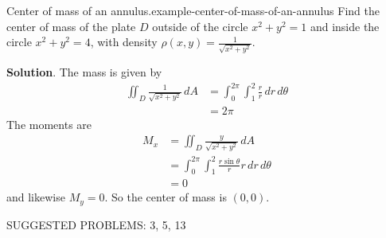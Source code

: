 \documentclass[10pt,]{book}
\numberwithin{equation}{section}
\begin{document}
\begin{example}{Center of mass of an annulus.}{example-center-of-mass-of-an-annulus}%
\hypertarget{p-1500}{}%
Find the center of mass of the plate \(D\) outside of the circle \(x^{2}+y^{2} = 1\) and inside the circle \(x^{2} + y^{2} = 4\), with density \(\rho(x,y) = \frac{1}{\sqrt{x^{2} + y^{2}}}\).%
\par\smallskip%
\noindent\textbf{Solution}.\hypertarget{solution-247}{}\quad%
\hypertarget{p-1501}{}%
The mass is given by%
\begin{align*}
\iint_{D} \frac{1}{\sqrt{x^{2}+y^{2}}}\,dA & = \int_{0}^{2\pi}\int_{1}^{2}\frac{r}{r}\,dr\,d\theta \\
& = 2\pi 
\end{align*}
The moments are%
\begin{align*}
M_{x} & = \iint_{D}\frac{y}{\sqrt{x^{2} + y^{2}}}\,dA \\
& = \int_{0}^{2\pi}\int_{1}^{2} \frac{r\sin\theta}{r}r\,dr\,d\theta \\
& = 0 
\end{align*}
and likewise \(M_{y} = 0\). So the center of mass is \((0,0)\).%
\end{example}
\begin{conclusion}{}%
\hypertarget{p-1502}{}%
SUGGESTED PROBLEMS: 3, 5, 13%
\end{conclusion}%
%
%
\typeout{************************************************}
\typeout{************************************************}
%
\end{document}
